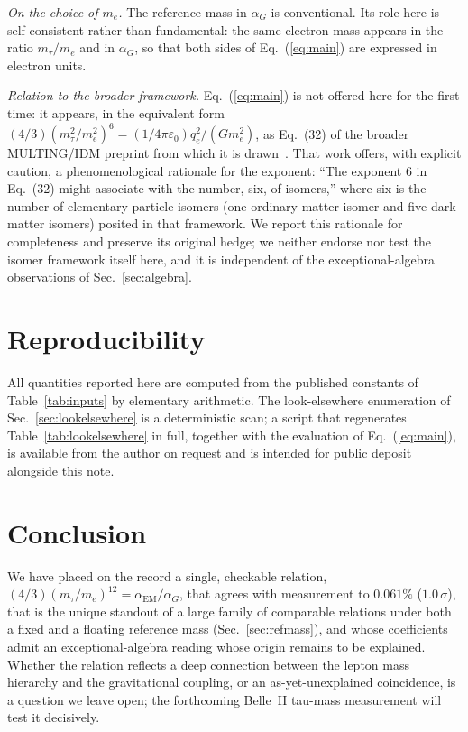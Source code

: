 \documentclass[aps,prd,preprint,amsmath,amssymb,nofootinbib]{revtex4-2}
\begin{document}
\emph{On the choice of $m_e$.} The reference mass in $\alpha_G$ is
conventional. Its role here is self-consistent rather than fundamental: the
same electron mass appears in the ratio $m_\tau/m_e$ and in $\alpha_G$, so that
both sides of Eq.~(\ref{eq:main}) are expressed in electron units.

\emph{Relation to the broader framework.} Eq.~(\ref{eq:main}) is not offered
here for the first time: it appears, in the equivalent form
$(4/3)(m_\tau^2/m_e^2)^6 = (1/4\pi\varepsilon_0)q_e^2/(Gm_e^2)$, as Eq.~(32) of
the broader MULTING/IDM preprint from which it is drawn~\cite{buckholtzv6}.
That work offers, with explicit caution, a phenomenological rationale for the
exponent: ``The exponent 6 in Eq.~(32) might associate with the number, six,
of isomers,'' where six is the number of elementary-particle isomers (one
ordinary-matter isomer and five dark-matter isomers) posited in that
framework. We report this rationale for completeness and preserve its
original hedge; we neither endorse nor test the isomer framework itself
here, and it is independent of the exceptional-algebra observations of
Sec.~\ref{sec:algebra}.

\section{Reproducibility}

All quantities reported here are computed from the published constants of
Table~\ref{tab:inputs} by elementary arithmetic. The look-elsewhere enumeration
of Sec.~\ref{sec:lookelsewhere} is a deterministic scan; a script that
regenerates Table~\ref{tab:lookelsewhere} in full, together with the evaluation
of Eq.~(\ref{eq:main}), is available from the author on request and is intended
for public deposit alongside this note.

\section{Conclusion}

We have placed on the record a single, checkable relation,
$(4/3)(m_\tau/m_e)^{12} = \alpha_{\mathrm{EM}}/\alpha_G$, that agrees with
measurement to $0.061\%$ ($1.0\,\sigma$), that is the unique standout of a
large family of comparable relations under both a fixed and a floating
reference mass (Sec.~\ref{sec:refmass}), and whose coefficients admit an
exceptional-algebra reading whose origin remains to be explained. Whether the
relation reflects a deep connection between the lepton mass hierarchy and the
gravitational coupling, or an as-yet-unexplained coincidence, is a question we
leave open; the forthcoming Belle~II tau-mass measurement will test it
decisively.
\end{document}
